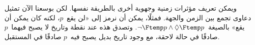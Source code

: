 \documentclass[../../../include/open-logic-section]{subfiles}
\begin{document}
ويمكن تعريف مؤثرات زمنية وجهوية أخرى بالطريقة نفسها. لكن بوسعنا الآن تمثيل
دعاوى تجمع بين الزمن والجهة. فمثلًا، يمكن أن نرمز إلى «لن يقع~$p$، لكنه كان
يمكن أن يقع» بالصيغة~$\lnot \Ftemp p \land \Diamond \Ftemp p$. وتصدق
هذه عند نقطة وتاريخ لا يصبح فيهما~$p$ صادقًا في حالة لاحقة، مع وجود تاريخ
بديل يصبح فيه~$p$ صادقًا في المستقبل.
\end{document}
